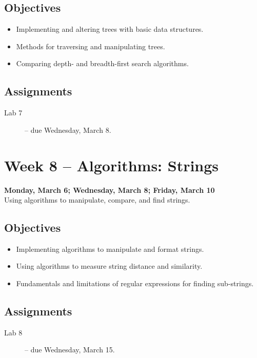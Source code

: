\documentclass[10pt]{memoir}
\begin{document}
    \subsection{Objectives}
    \begin{itemize}
        \item Implementing and altering trees with basic data structures.
        \item Methods for traversing and manipulating trees.
        \item Comparing depth- and breadth-first search algorithms.
    \end{itemize}

    \subsection{Assignments}
    \begin{description}
        \item[Lab 7 ] -- due Wednesday, March 8.
    \end{description}
    
\section{Week 8 -- Algorithms: Strings}
\textcolor{CUGold}{\textbf{Monday, March 6; Wednesday, March 8; Friday, March 10}}\\
Using algorithms to manipulate, compare, and find strings.

    \subsection{Objectives}
    \begin{itemize}
        \item Implementing algorithms to manipulate and format strings.
        \item Using algorithms to measure string distance and similarity.
        \item Fundamentals and limitations of regular expressions for finding sub-strings.
    \end{itemize}

    \subsection{Assignments}
    \begin{description}
        \item[Lab 8 ] -- due Wednesday, March 15.
    \end{description}
    
\end{document}

